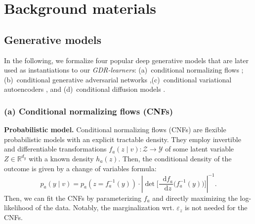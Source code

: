 \documentclass[dvipsnames]{article} %
\newcommand*\diff{\mathop{}\!\mathrm{d}}
\newcommand{\abs}[1]{\left\lvert #1 \right\rvert}
\newcommand{\GDRlearners}{\emph{GDR-learners}\xspace}
\begin{document}
\newpage
\section{Background materials} \label{app:background}
\subsection{Generative models} \label{app:background-gm}

In the following, we formalize four popular deep generative models that are later used as instantiations to our \GDRlearners: (a)~conditional normalizing flows \citep{rezende2015variational,trippe2018conditional}; (b)~conditional generative adversarial networks \citep{goodfellow2014generative, laria2022transferring},(c)~conditional variational autoencoders \citep{kingma2014auto,oh2022cvae}, and (d)~conditional diffusion models \citep{ho2020denoising,lutati2023ocd}.

\subsubsection{(a) Conditional normalizing flows (CNFs)}
\textbf{Probabilistic model.} Conditional normalizing flows (CNFs) \citep{tabak2010density,rezende2015variational,trippe2018conditional} are flexible probabilistic models with an explicit tractable density. They employ invertible and differentiable transformations $f_a(z \mid v): \mathcal{Z} \to \mathcal{Y}$ of some latent variable $Z \in \mathbb{R}^{d_y}$ with a known density $h_a(z)$. Then, the conditional density of the outcome is given by a change of variables formula:
\begin{equation}
    p_a(y \mid v) = p_a(z = f_a^{-1}(y)) \cdot \abs{\operatorname{det}\bigg[\frac{\diff f_a}{\diff z} \big(f_a^{-1}(y)\big) \bigg]}^{-1}.
\end{equation}
Then, we can fit the CNFs by parameterizing $f_a$ and directly maximizing the log-likelihood of the data. Notably, the marginalization wrt. $\varepsilon_z$ is not needed for the CNFs.
\end{document}
